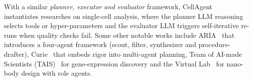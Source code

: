 With a similar \textit{planner, executor and evaluator} framework, CellAgent~\cite{xiao2024cellagentllmdrivenmultiagentframework} instantiates researches on single-cell analysis, where the planner LLM reasoning selects tools or hyper-parameters and the evaluator LLM triggers self-iterative re-runs when quality checks fail. Some other notable works include ARIA~\cite{ramirezmedina2025acceleratingscientificresearchmultillm} that introduces a four-agent framework (scout, filter, synthesizer and procedure-drafter), Curie~\cite{kon2025curierigorousautomatedscientific} that embeds rigor into multi-agent planning, Team of AI-made Scientists (TAIS)~\cite{liu2024toward} for gene-expression discovery and the Virtual Lab~\cite{swanson2024virtual} for nano-body design with role agents. 

